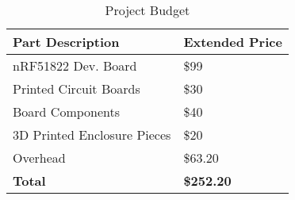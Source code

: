 
\begin{table}[H]
    \caption[Project Budget]{Project Budget}
    \begin{tabu}  to \textwidth {|   X[2,l] 
                                     X[1,r]
                                 |}
      \hline
      \textbf{Part Description}   & \textbf{Extended Price} \\ \hline
      nRF51822 Dev. Board         & \$99                    \\
      Printed Circuit Boards      & \$30                    \\
      Board Components            & \$40                    \\
      3D Printed Enclosure Pieces & \$20                    \\
      Overhead                    & \$63.20                 \\ \hline
      \textbf{Total}              & \textbf{\$252.20}       \\ \hline
      
    \end{tabu}
\end{table}